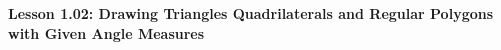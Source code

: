 \begin{center}
\textbf{Lesson 1.02: Drawing Triangles Quadrilaterals and Regular Polygons with Given Angle Measures}
\end{center}

\vspace*{-1.5ex}

